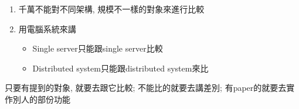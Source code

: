 \begin{enumerate}
  \item
  {
    千萬不能對不同架構, 規模不一樣的對象來進行比較
  } %

  \item
  {
    用電腦系統來講
    \begin{itemize}
      \item
      {
        Single server只能跟single server比較
      } %

      \item
      {
        Distributed system只能跟distributed system來比
      } %
    \end{itemize}
  } %
\end{enumerate}


只要有提到的對象, 就要去跟它比較; 不能比的就要去講差別; 有paper的就要去實作別人的部份功能


